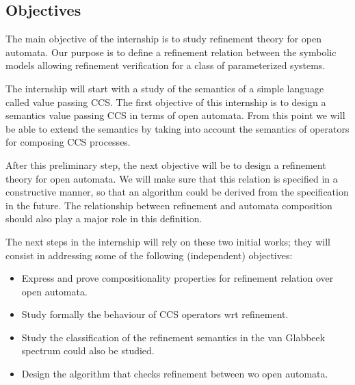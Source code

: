 \documentclass[11pt,fleqn]{article}
\begin{document}
\subsection*{Objectives}


The main objective of the internship is to study refinement theory for open automata.  
Our purpose is to define a refinement relation between the symbolic models allowing refinement verification for a class of parameterized systems.

The internship will start with a study of the semantics of a simple language called value passing CCS. The first objective of this internship is to design a semantics value passing CCS in terms of open automata. From this point we will be able to extend the semantics by taking into account the semantics of operators for composing CCS processes.

After this preliminary step, the next objective will be to design a refinement theory for open automata. We will make sure that this relation is specified in a constructive manner, so that an algorithm could be derived from the specification in the future.
The relationship between refinement and automata composition should also play a major role in this definition.



The next steps in the internship will rely on these two initial works; they will consist in addressing some of the following (independent) objectives:
\begin{itemize}
\item Express and prove compositionality properties for refinement relation over open automata.
\item Study formally the behaviour of CCS operators wrt refinement.
\item Study the classification of the refinement semantics in the van Glabbeek spectrum could also be studied.
\item Design the algorithm that checks refinement between wo open automata.
\end{itemize}
\end{document}
